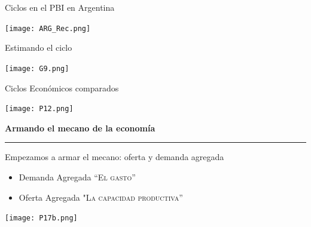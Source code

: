 \documentclass{beamer}
\begin{document}

\begin{frame}{Ciclos en el PBI en Argentina}

\centering\texttt{[image: ARG\_Rec.png]}\

\end{frame}




\begin{frame}{Estimando el ciclo}

\centering\texttt{[image: G9.png]}\

\end{frame}


\begin{frame}{Ciclos Económicos comparados}

\centering\texttt{[image: P12.png]}\

\end{frame}





\begin{frame}{}
\centering\huge\textbf{Armando el mecano de la economía} 
\vspace{2mm}
\hrule
\end{frame}


\begin{frame}{Empezamos a armar el mecano: oferta y demanda agregada}

    \begin{itemize}
        \item Demanda Agregada \textsc{“El gasto”} \faCartPlus
        \item Oferta Agregada \textsc{"La capacidad productiva”} \faIndustry
    \end{itemize}
    \vspace{3mm}
    
    \centering\texttt{[image: P17b.png]}\

\end{frame}

\end{document}
